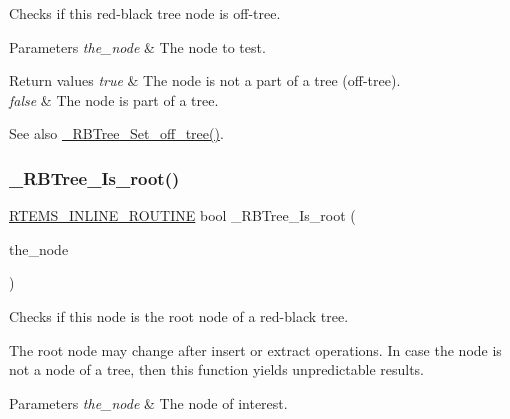 Checks if this red-\/black tree node is off-\/tree. 


\begin{DoxyParams}{Parameters}
{\em the\+\_\+node} & The node to test.\\
\hline
\end{DoxyParams}

\begin{DoxyRetVals}{Return values}
{\em true} & The node is not a part of a tree (off-\/tree). \\
\hline
{\em false} & The node is part of a tree.\\
\hline
\end{DoxyRetVals}
\begin{DoxySeeAlso}{See also}
\mbox{\hyperlink{group__RTEMSScoreRBTree_ga82d9b6f1aad201e7c8b614a0e970b356}{\+\_\+\+R\+B\+Tree\+\_\+\+Set\+\_\+off\+\_\+tree()}}. 
\end{DoxySeeAlso}
\mbox{\label{group__RTEMSScoreRBTree_ga8496286f0a637353c8046e0d2625ea08}} 
\subsubsection{\texorpdfstring{\_RBTree\_Is\_root()}{\_RBTree\_Is\_root()}}
{\footnotesize\ttfamily \mbox{\hyperlink{group__RTEMSScoreBaseDefs_gac216239df231d5dbd15e3520b0b9313f}{R\+T\+E\+M\+S\+\_\+\+I\+N\+L\+I\+N\+E\+\_\+\+R\+O\+U\+T\+I\+NE}} bool \+\_\+\+R\+B\+Tree\+\_\+\+Is\+\_\+root (\begin{DoxyParamCaption}\item[{const \mbox{\hyperlink{structRBTree__Node}{R\+B\+Tree\+\_\+\+Node}} $\ast$}]{the\+\_\+node }\end{DoxyParamCaption})}



Checks if this node is the root node of a red-\/black tree. 

The root node may change after insert or extract operations. In case the node is not a node of a tree, then this function yields unpredictable results.


\begin{DoxyParams}{Parameters}
{\em the\+\_\+node} & The node of interest.\\
\hline
\end{DoxyParams}

